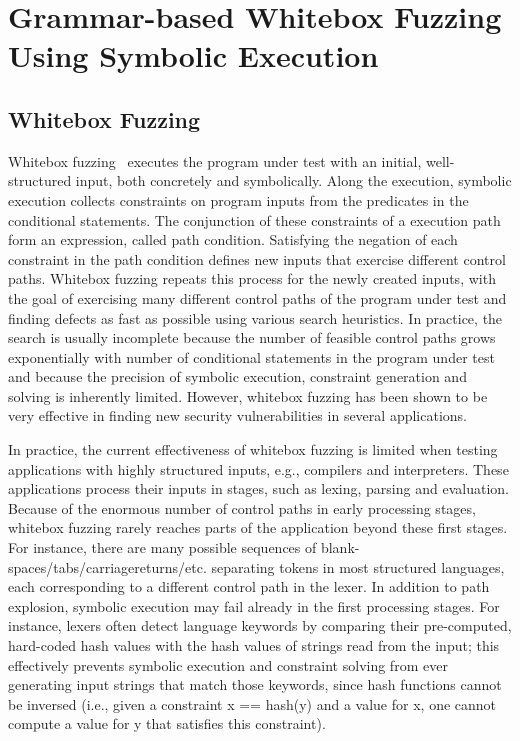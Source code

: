 \section{Grammar-based Whitebox Fuzzing Using Symbolic Execution}
\subsection{Whitebox Fuzzing}
Whitebox fuzzing~\cite{fuzzing} executes the program under test with an initial, well-structured input, both concretely and symbolically. Along the execution, symbolic execution collects constraints on program inputs from the predicates in the conditional statements. The conjunction of these constraints of a execution path form an expression, called path condition. Satisfying the negation of each constraint in the path condition defines new inputs that exercise different control paths. Whitebox fuzzing repeats this process for the newly created inputs, with the goal of exercising many different control paths of the program under test and finding defects as fast as possible using various search heuristics. In practice, the search is usually incomplete because the number of feasible control paths grows exponentially with number of conditional statements in the program under test and because the precision of symbolic execution, constraint generation and solving is inherently limited. However, whitebox fuzzing has been shown to be very effective in finding new security vulnerabilities in several applications.

In practice, the current effectiveness of whitebox fuzzing is limited when testing applications with highly structured
inputs, e.g., compilers and interpreters. These applications process their inputs in stages, such as lexing, parsing and evaluation. Because of the enormous number of control paths in early processing stages, whitebox fuzzing rarely reaches parts of the application beyond these first stages. For instance, there are many possible sequences of blank-spaces/tabs/carriagereturns/etc. separating tokens in most structured languages, each corresponding to a different control path in the lexer. In addition to path explosion, symbolic execution may fail already in the first processing stages. For instance, lexers often detect language keywords by comparing their pre-computed, hard-coded hash values with the hash values of strings read from the input; this effectively prevents symbolic execution and constraint solving from ever generating input strings that match those keywords, since hash functions cannot be inversed (i.e., given a constraint x == hash(y) and a value for x, one cannot compute a value for y that satisfies this constraint).

